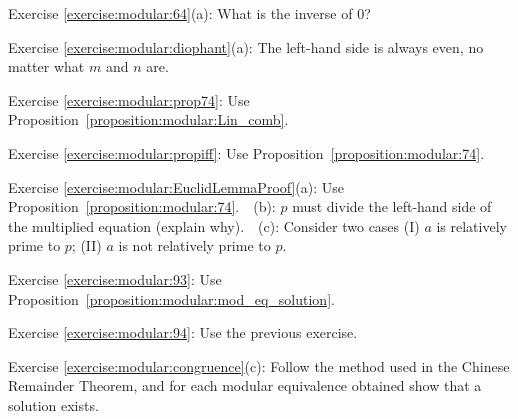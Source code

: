 \noindent Exercise \ref{exercise:modular:64}(a): What is the inverse of $0$?

\noindent Exercise \ref{exercise:modular:diophant}(a): The left-hand side is always even, no matter what $m$ and $n$ are.

\noindent Exercise \ref{exercise:modular:prop74}: Use Proposition~\ref{proposition:modular:Lin_comb}.

\noindent Exercise \ref{exercise:modular:propiff}: Use Proposition~\ref{proposition:modular:74}.

\noindent Exercise \ref{exercise:modular:EuclidLemmaProof}(a): Use  Proposition~\ref{proposition:modular:74}.~~(b): $p$ must divide the left-hand side of the multiplied equation (explain why).~~(c): Consider two cases (I) $a$ is relatively prime to $p$; (II) $a$ is not relatively prime to $p$.

\noindent Exercise \ref{exercise:modular:93}: Use Proposition~\ref{proposition:modular:mod_eq_solution}. 

\noindent Exercise \ref{exercise:modular:94}: Use the previous exercise.

\noindent Exercise \ref{exercise:modular:congruence}(c): Follow the method used in the Chinese Remainder Theorem, and for each modular equivalence obtained show that a solution exists.